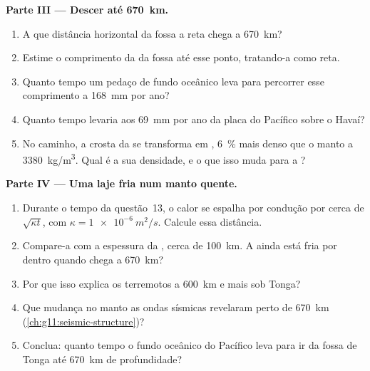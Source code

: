 \begin{problem}
\medskip
\noindent\textbf{Parte III --- Descer até \qty{670}{km}.}
\begin{enumerate}[resume]
  \item A que distância horizontal da fossa a reta chega a \qty{670}{km}?
  \item Estime o comprimento da  da fossa até esse ponto, tratando-a
        como reta.
  \item Quanto tempo um pedaço de fundo oceânico leva para percorrer esse
        comprimento a \qty{168}{mm} por ano?
  \item Quanto tempo levaria aos \qty{69}{mm} por ano da placa do Pacífico
        sobre o Havaí?
  \item No caminho, a crosta da  se transforma em ,
        \qty{6}{\percent} mais denso que o manto a \qty{3380}{kg/m^3}. Qual
        é a sua densidade, e o que isso muda para a ?
\end{enumerate}

\medskip
\noindent\textbf{Parte IV --- Uma laje fria num manto quente.}
\begin{enumerate}[resume]
  \item Durante o tempo da questão~13, o calor se espalha por condução por
        cerca de $\sqrt{\kappa t}$, com $\kappa = \qty{1e-6}{m^2/s}$. Calcule
        essa distância.
  \item Compare-a com a espessura da , cerca de \qty{100}{km}. A 
        ainda está fria por dentro quando chega a \qty{670}{km}?
  \item Por que isso explica os terremotos a \qty{600}{km} e mais sob
        Tonga?
  \item Que mudança no manto as ondas sísmicas revelaram perto de
        \qty{670}{km} (\cref{ch:g11:seismic-structure})?
  \item Conclua: quanto tempo o fundo oceânico do Pacífico leva para ir da
        fossa de Tonga até \qty{670}{km} de profundidade?
\end{enumerate}
\end{problem}
